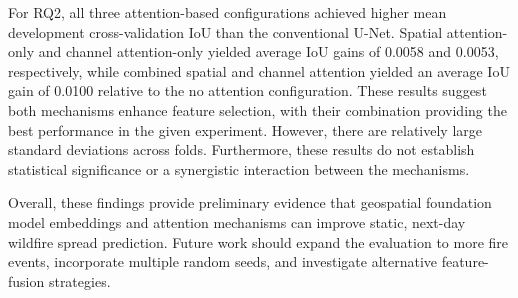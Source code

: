 \documentclass[sigconf]{acmart}
\begin{document}
For RQ2, all three attention-based configurations achieved higher mean development cross-validation IoU than the conventional 
U-Net. Spatial attention-only and channel attention-only yielded average IoU gains of 0.0058 and 0.0053, respectively, while 
combined spatial and channel attention yielded an average IoU gain of 0.0100 relative to the no attention configuration. These results suggest 
both mechanisms enhance feature selection, with their combination providing the best performance in the
given experiment. However, there are relatively large standard deviations
across folds. Furthermore, these results do not establish statistical significance or a synergistic interaction
between the mechanisms.

Overall, these findings provide preliminary evidence that geospatial foundation model embeddings and attention mechanisms can 
improve static, next-day wildfire spread prediction. Future work should expand the evaluation to more fire
events, incorporate multiple random seeds, and investigate alternative feature-fusion strategies. 



\end{document}
